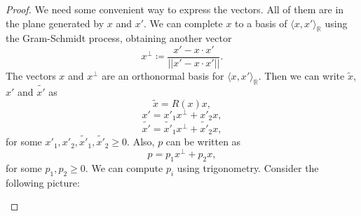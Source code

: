\documentclass[10pt,a4paper]{amsart}
\newcommand{\realNumbers}{\mathbb{R}}
\begin{document}
\begin{proof}
	We need some convenient way to express the vectors. All of them are in the plane generated by $x$ and $x'$. We can complete $x$ to a basis of $\langle x, x' \rangle_\realNumbers$ using the Gram-Schmidt process, obtaining another vector
	\begin{equation}
		x^\perp \coloneqq \frac{x' -x \cdot x'}{||x' -x \cdot x'||}.
	\end{equation}
	The vectors $x$ and $x^\perp$ are an orthonormal basis for $\langle x, x' \rangle_\realNumbers$. Then we can write $\widetilde{x}$, $x'$ and $\widetilde{x'}$ as
	\begin{equation}
		\label{equation: tilde x}
		\widetilde{x} = R(x) x,
	\end{equation}
	\begin{equation}
		x' = x'_1 x^\perp + x'_2 x,
	\end{equation}
	\begin{equation}
		\label{equation: x' in base}
		\widetilde{x'} = \widetilde{x'}_1 x^\perp + \widetilde{x'}_2 x,
	\end{equation}
	for some $x'_1, x'_2, \widetilde{x'}_1, \widetilde{x'}_2 \geq 0$. Also, $p$ can be written as
	\begin{equation}
		p = p_1 x^\perp + p_2 x ,
	\end{equation}
	for some $p_1, p_2 \geq 0$. We can compute $p_i$ using trigonometry. Consider the following picture:
	\begin{center}
		\begin{tikzpicture}[x=0.75pt,y=0.75pt,yscale=-1,xscale=1]
			

\end{tikzpicture}
\end{center}
\end{proof}
\end{document}
